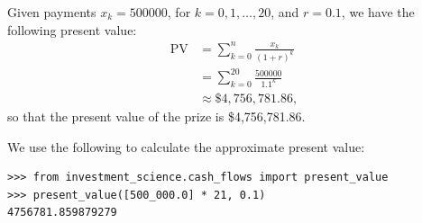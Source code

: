 Given payments $x_k = 500000$, for $k = 0, 1, \ldots, 20$, and $r = 0.1$, we
have the following present value:
\begin{equation*}
    \begin{split}
        \text{PV} &= \sum_{k = 0}^n{\frac{x_k}{{(1 + r)}^k}} \\
        &= \sum_{k = 0}^{20}{\frac{500000}{1.1^k}} \\
        &\approx \$4,756,781.86,
    \end{split}
\end{equation*}
so that the present value of the prize is \$4,756,781.86.

We use the following to calculate the approximate present value:
\begin{lstlisting}
>>> from investment_science.cash_flows import present_value
>>> present_value([500_000.0] * 21, 0.1)
4756781.859879279
\end{lstlisting}
